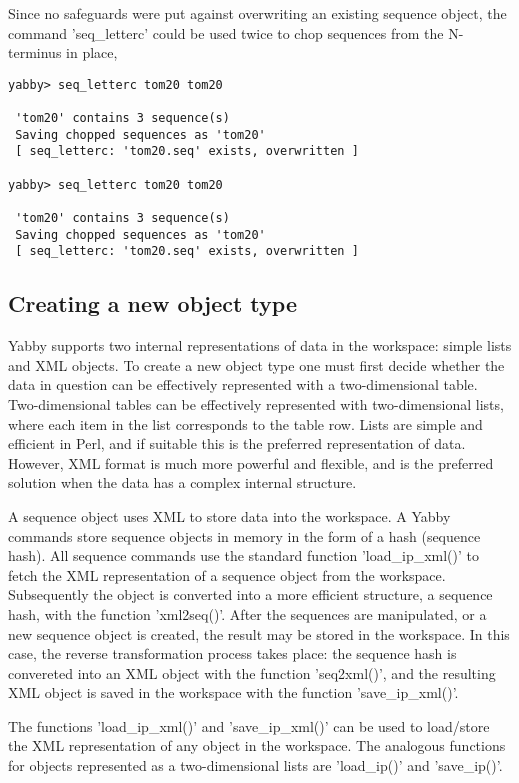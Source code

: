 Since no safeguards were put against overwriting an existing
sequence object, the command 'seq\_letterc' could be used
twice to chop sequences from the N-terminus in place,

\begin{verbatim}
yabby> seq_letterc tom20 tom20

 'tom20' contains 3 sequence(s)
 Saving chopped sequences as 'tom20'
 [ seq_letterc: 'tom20.seq' exists, overwritten ]

yabby> seq_letterc tom20 tom20

 'tom20' contains 3 sequence(s)
 Saving chopped sequences as 'tom20'
 [ seq_letterc: 'tom20.seq' exists, overwritten ]
\end{verbatim}

\subsection{Creating a new object type}

Yabby supports two internal representations of data in the workspace:
simple lists and XML objects. To create a new object type one must
first decide whether the data in question can be effectively
represented with a two-dimensional table. Two-dimensional tables
can be effectively represented with two-dimensional lists, where
each item in the list corresponds to the table row. Lists are simple
and efficient in Perl, and if suitable this is the preferred
representation of data. However, XML format is much more powerful
and flexible, and is the preferred solution when the data has
a complex internal structure.

A sequence object uses XML to store data into the workspace.
A Yabby commands store sequence objects
in memory in the form of a hash (sequence hash).  All sequence
commands use the standard function 'load\_ip\_xml()' to fetch the XML
representation of a sequence object from the workspace. Subsequently
the object is converted into a more efficient structure, a
sequence hash, with the function 'xml2seq()'. After the sequences
are manipulated, or a new sequence object is created, the result
may be stored in the workspace. In this case, the reverse
transformation process takes place:  the sequence hash is convereted
into an XML object with the function 'seq2xml()', and the resulting
XML object is saved in the workspace with the function 'save\_ip\_xml()'.

The functions 'load\_ip\_xml()' and 'save\_ip\_xml()' can be used
to load/store the XML representation of any object in the workspace.
The analogous functions for objects represented as a two-dimensional
lists are 'load\_ip()' and 'save\_ip()'.

